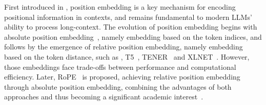 

First introduced in \citet{Vaswani2017attention}, position embedding is a key mechanism for encoding positional information in contexts, and remains fundamental to modern LLMs' ability to process long-context. 
The evolution of position embedding begins with absolute position embedding~\citep{Vaswani2017attention}, namely embedding based on the token indices, and follows by the emergence of relative position embedding, namely embedding based on the token distance, such as \citet{shaw2018self}, T5~\citep{raffel2020exploring}, TENER~\citep{yan2019tener} and XLNET~\citep{dai2019transformer}. However, those embeddings face trade-offs between performance and computational efficiency. Later, RoPE~\citep{su2024roformer} is proposed, achieving relative position embedding through absolute position embedding, combining the advantages of both approaches and thus becoming a significant academic interest~\citep{chowdhery2023palm,touvron2023llama,touvron2023llama2,Sun2024MOSS,chen2023extending,dynamicNTK}.

